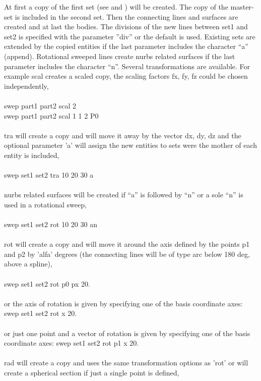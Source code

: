 \documentclass{article}
\begin{document}
At first a copy of the first set (see  and ) will be created. The copy of the master-set is included in the second set. Then the connecting lines and surfaces are created and at last the bodies. The divisions of the new lines between set1 and set2 is specified with the parameter ''div'' or the default is used. Existing sets are extended by the copied entities if the last parameter includes the character ``a'' (append). Rotational sweeped lines create nurbs related surfaces if the last parameter includes the character ``n''. Several transformations are available. For example scal creates a scaled copy, the scaling factors fx, fy, fz could be chosen independently,\\\\
swep part1 part2 scal 2 \\
swep part1 part2 scal 1 1 2 P0\\\\
tra will create a copy and will move it away by the vector dx, dy, dz and the optional parameter 'a' will assign the new entities to sets were the mother of each entity is included,\\\\
swep set1 set2 tra 10 20 30 a\\\\
nurbs related surfaces will be created if ``a'' is followed by ``n'' or a sole ``n'' is used in a rotational sweep,\\\\ 
swep set1 set2 rot 10 20 30 an\\\\
rot will create a copy and will move it around the axis defined by the points p1 and p2 by 'alfa' degrees (the connecting lines will be of type arc below 180 deg, above a spline),\\\\
swep set1 set2 rot p0 px 20.\\\\
or the axis of rotation is given by specifying one of the basis coordinate axes:
swep set1 set2 rot x 20.\\\\
or just one point and a vector of rotation is given by specifying one of the basis coordinate axes:
swep set1 set2 rot p1 x 20.\\\\
rad will create a copy and uses the same transformation options as 'rot' or will create a spherical section if just a single point is defined,\\\\
\end{document}
